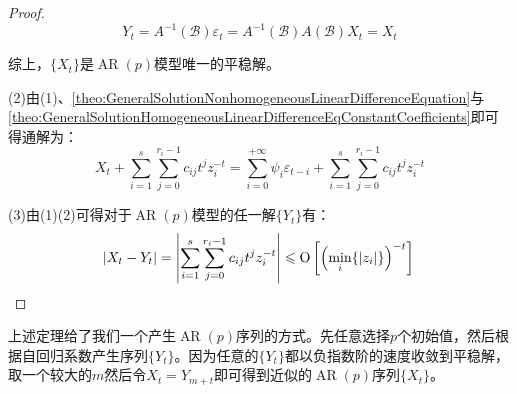 \begin{proof}
\begin{equation*}
		Y_t=A^{-1}(\mathcal{B})\varepsilon_t=A^{-1}(\mathcal{B})A(\mathcal{B})X_t=X_t
	\end{equation*}\par
	综上，$\{X_t\}$是$\operatorname{AR}(p)$模型唯一的平稳解。\par
	(2)由(1)、\cref{theo:GeneralSolutionNonhomogeneousLinearDifferenceEquation}与\cref{theo:GeneralSolutionHomogeneousLinearDifferenceEqConstantCoefficients}即可得通解为：
	\begin{equation*}
		X_t+\sum_{i=1}^{s}\sum_{j=0}^{r_i-1}c_{ij}t^{j}z_i^{-t}=\sum_{i=0}^{+\infty}\psi_i\varepsilon_{t-i}+\sum_{i=1}^{s}\sum_{j=0}^{r_i-1}c_{ij}t^{j}z_i^{-t}
	\end{equation*}\par
	(3)由(1)(2)可得对于$\operatorname{AR}(p)$模型的任一解$\{Y_t\}$有：
	\begin{equation*}
		|X_t-Y_t|=\left|\sum_{i=1}^{s}\sum_{j=0}^{r_i-1}c_{ij}t^{j}z_i^{-t}\right|\leqslant \operatorname{O}\left[\left(\min_i\{|z_i|\}\right)^{-t}\right]\qedhere
	\end{equation*}
\end{proof}
\begin{note}
	上述定理给了我们一个产生$\operatorname{AR}(p)$序列的方式。先任意选择$p$个初始值，然后根据自回归系数产生序列$\{Y_t\}$。因为任意的$\{Y_t\}$都以负指数阶的速度收敛到平稳解，取一个较大的$m$然后令$X_t=Y_{m+t}$即可得到近似的$\operatorname{AR}(p)$序列$\{X_t\}$。
\end{note}
